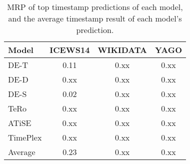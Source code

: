 \begin{table*}[htb]
\centering
\begin{minipage}{0.95\textwidth}
\centering
\caption{MRP of top timestamp predictions of each model, and the average timestamp result of each model's prediction.}
\vspace{-3mm}

\begin{tabular}{l|ccc}\hline
Model & ICEWS14 & WIKIDATA & YAGO \\ \hline
DE-T & 0.11 & 0.xx & 0.xx \\ 
DE-D & 0.xx & 0.xx & 0.xx \\ 
DE-S & 0.02 & 0.xx & 0.xx \\ 
TeRo & 0.xx & 0.xx & 0.xx \\ 
ATiSE & 0.xx & 0.xx & 0.xx \\ 
TimePlex & 0.xx & 0.xx & 0.xx \\ \hline 
Average & 0.23 & 0.xx & 0.xx \\ \hline 

\end{tabular}

\label{fig:timestamp_voting_table}
\end{minipage}
\end{table*}

